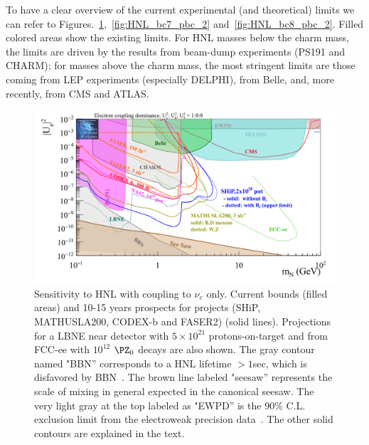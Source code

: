 To have a clear overview of the current experimental (and theoretical)
limits we can refer to
Figures.~\ref{fig:HNL_bc6_pbc_2},~\ref{fig:HNL_bc7_pbc_2}
and~\ref{fig:HNL_bc8_pbc_2}. Filled colored areas show the existing limits. For HNL masses below the charm mass, the limits are driven by the results from beam-dump experiments (PS191 and CHARM); for masses above
the charm mass, the most stringent limits are those coming from LEP experiments
(especially DELPHI), from Belle, and, more recently, from CMS and ATLAS.



\begin{figure}[h]
  \centering
  \includegraphics[width=.90\textwidth]{Figures/c3/HNL_bc6_pbc_2.png}
    \caption{Sensitivity to HNL with coupling to $\nu_e$ only. Current bounds (filled areas) and 10-15 years prospects for projects
(SHiP, MATHUSLA200, CODEX-b and FASER2) (solid lines). Projections for a LBNE
near detector with $5\times 10^{21}$ protons-on-target and from FCC-ee with
$10^{12}$ $\PZ_0$ decays are also shown.
The gray contour named "BBN'' corresponds to a HNL lifetime $>1$sec,
which is disfavored by BBN~\cite{Ruchayskiy_2012}. The brown line
labeled "seesaw'' represents the scale of mixing in general expected
in the canonical seesaw. The very light gray at the top
labeled as "EWPD'' is the 90\% C.L. exclusion limit from the
electroweak precision data~\cite{Antusch_2015}. The other solid
contours are explained in the text. 
}
  \label{fig:HNL_bc6_pbc_2}
\end{figure}

